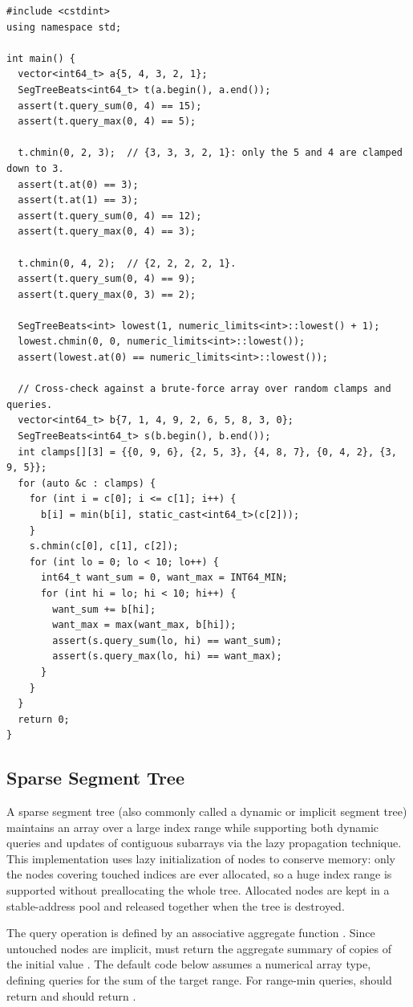 \begin{lstlisting}[style=cpp]
#include <cstdint>
using namespace std;

int main() {
  vector<int64_t> a{5, 4, 3, 2, 1};
  SegTreeBeats<int64_t> t(a.begin(), a.end());
  assert(t.query_sum(0, 4) == 15);
  assert(t.query_max(0, 4) == 5);

  t.chmin(0, 2, 3);  // {3, 3, 3, 2, 1}: only the 5 and 4 are clamped down to 3.
  assert(t.at(0) == 3);
  assert(t.at(1) == 3);
  assert(t.query_sum(0, 4) == 12);
  assert(t.query_max(0, 4) == 3);

  t.chmin(0, 4, 2);  // {2, 2, 2, 2, 1}.
  assert(t.query_sum(0, 4) == 9);
  assert(t.query_max(0, 3) == 2);

  SegTreeBeats<int> lowest(1, numeric_limits<int>::lowest() + 1);
  lowest.chmin(0, 0, numeric_limits<int>::lowest());
  assert(lowest.at(0) == numeric_limits<int>::lowest());

  // Cross-check against a brute-force array over random clamps and queries.
  vector<int64_t> b{7, 1, 4, 9, 2, 6, 5, 8, 3, 0};
  SegTreeBeats<int64_t> s(b.begin(), b.end());
  int clamps[][3] = {{0, 9, 6}, {2, 5, 3}, {4, 8, 7}, {0, 4, 2}, {3, 9, 5}};
  for (auto &c : clamps) {
    for (int i = c[0]; i <= c[1]; i++) {
      b[i] = min(b[i], static_cast<int64_t>(c[2]));
    }
    s.chmin(c[0], c[1], c[2]);
    for (int lo = 0; lo < 10; lo++) {
      int64_t want_sum = 0, want_max = INT64_MIN;
      for (int hi = lo; hi < 10; hi++) {
        want_sum += b[hi];
        want_max = max(want_max, b[hi]);
        assert(s.query_sum(lo, hi) == want_sum);
        assert(s.query_max(lo, hi) == want_max);
      }
    }
  }
  return 0;
}
\end{lstlisting}
\subsection{Sparse Segment Tree}
\label{sec:2.5.10}
A sparse segment tree (also commonly called a dynamic or implicit segment tree) maintains an array over a large index range while supporting both dynamic queries and updates of contiguous subarrays via the lazy propagation technique. This implementation uses lazy initialization of nodes to conserve memory: only the nodes covering touched indices are ever allocated, so a huge index range is supported without preallocating the whole tree. Allocated nodes are kept in a stable-address pool and released together when the tree is destroyed.

The query operation is defined by an associative aggregate function . Since untouched nodes are implicit,  must return the aggregate summary of  copies of the initial value . The default code below assumes a numerical array type, defining queries for the sum of the target range. For range-min queries,  should return  and  should return .

